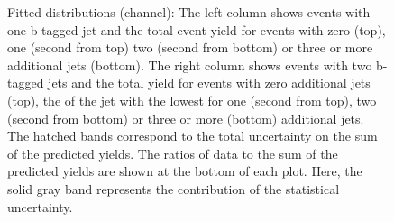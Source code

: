 \begin{figure}[htbp!]
\begin{center}

\caption{Fitted distributions (\ee channel): 
  The left column shows events with one b-tagged jet and the total event yield for events with zero (top), one (second from top)
  two (second from bottom) or three or more additional jets (bottom).
  The right column shows events with two b-tagged jets and the total yield for events with zero additional jets (top),
 the \pt of the jet with the lowest \pt for one (second from top),
  two (second from bottom) or three or more (bottom) additional jets.
  The hatched bands correspond to the total uncertainty on the sum of
  the predicted yields. The ratios of data to the sum of the
  predicted yields are shown at the bottom of each plot. Here, the solid
  gray band represents the contribution of the statistical uncertainty.  
       \label{fig:lh_ee_postfitdistr8}}
  \end{center}
\end{figure}

